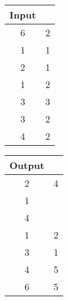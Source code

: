 \documentclass[11pt, a4paper, twoside]{article}
\begin{document}
\begin{itemize}
		\begin{minipage}{0.2\textwidth}
			\begin{tabular}{cc}
			   Input \\
			   \hline
			   6 & 2 \\
			   1 & 1 \\
			   2 & 1 \\
			   1 & 2 \\
			   3 & 3 \\
			   3 & 2 \\
			   4 & 2 \\
			\end{tabular}
		\end{minipage} 
		\begin{minipage}{0.2\textwidth}
			\begin{tabular}{cc}
			   Output \\
			   \hline
			   2 & 4 \\
			   1 &  \\
			   4 &  \\
			   1 & 2 \\
			   3 & 1 \\
			   4 & 5 \\
			   6 & 5 \\
			\end{tabular}
		\end{minipage} 
		
\end{itemize}
	
\end{document}
